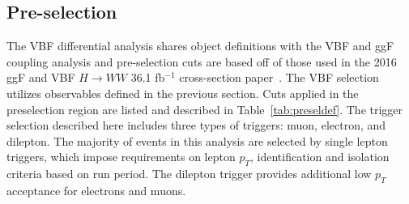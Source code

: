 \subsection{Pre-selection}
The VBF differential analysis shares object definitions with the VBF and ggF coupling analysis and pre-selection cuts are based off of those used in the 2016 ggF and VBF $H\rightarrow WW$ 36.1 fb$^{-1}$ cross-section paper~\cite{Aaboud_2019}. The VBF selection utilizes observables defined in the previous section. Cuts applied in the preselection region are listed and described in Table~\ref{tab:preseldef}. The trigger selection described here includes three types of triggers: muon, electron, and dilepton. The majority of events in this analysis are selected by single lepton triggers, which impose requirements on lepton $p_T$, identification and isolation criteria based on run period. The dilepton trigger provides additional low $p_T$ acceptance for electrons and muons.   
\begin{table}[h!]
\centering
{}
\caption{Table describing pre-selection cuts applied in common with VBF and $ggF$ coupling analyses}
\label{tab:preseldef}
\end{table}

